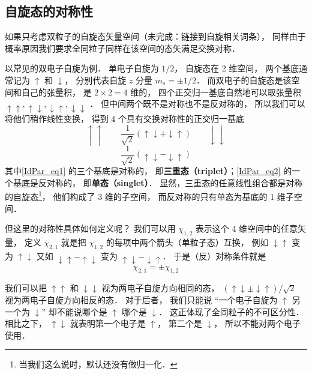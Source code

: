 \subsection{自旋态的对称性}
如果只考虑双粒子的自旋态矢量空间（未完成：链接到自旋相关词条）， 同样由于概率原因我们要求全同粒子同样在该空间的态矢满足交换对称．

\begin{example}{}\label{IdPar_ex1}
以常见的双电子自旋为例． 单电子自旋为 $1/2$， 自旋态在 2 维空间， 两个基底通常记为 $\uparrow$ 和 $\downarrow$， 分别代表自旋 $z$ 分量 $m_s=\pm 1/2$． 而双电子的自旋态是该空间和自己的张量积， 是 $2\times2 = 4$ 维的， 四个正交归一基底自然地可以取张量积 $\uparrow\uparrow, \uparrow\downarrow, \downarrow\uparrow, \downarrow\downarrow$ ． 但中间两个既不是对称也不是反对称的， 所以我们可以将他们稍作线性变换， 得到 4 个具有交换对称性的正交归一基底
\begin{equation}\label{IdPar_eq1}
\uparrow\uparrow \qquad \frac{1}{\sqrt 2}(\uparrow\downarrow + \downarrow\uparrow) \qquad \downarrow\downarrow
\end{equation}
\begin{equation}\label{IdPar_eq2}
\frac{1}{\sqrt 2}(\uparrow\downarrow - \downarrow\uparrow)
\end{equation}
其中\autoref{IdPar_eq1} 的三个基底是对称的， 即\textbf{三重态（triplet）}；\autoref{IdPar_eq2} 的一个基底是反对称的， 即\textbf{单态（singlet）}． %
显然，三重态的任意线性组合都是对称的自旋态\footnote{当我们这么说时，默认还没有做归一化．}， 他们构成了 3 维的子空间， 而反对称的只有单态为基底的 1 维子空间．

但这里的对称性具体如何定义呢？ 我们可以用 $\chi_{1,2}$ 表示这个 4 维空间中的任意矢量， 定义 $\chi_{2,1}$ 就是把 $\chi_{1,2}$ 的每项中两个箭头（单粒子态）互换， 例如 $\downarrow\uparrow$ 变为 $\uparrow\downarrow$ 又如 $\downarrow\uparrow - \uparrow\downarrow$ 变为 $\uparrow\downarrow - \downarrow\uparrow$． 于是（反）对称条件就是
\begin{equation}\label{IdPar_eq3}
\chi_{2,1} = \pm\chi_{1,2}
\end{equation}

我们可以把 $\uparrow\uparrow$ 和 $\downarrow\downarrow$ 视为两电子自旋方向相同的态， $(\uparrow\downarrow \pm \downarrow\uparrow)/\sqrt{2}$ 视为两电子自旋方向相反的态． 对于后者， 我们只能说 “一个电子自旋为 $\uparrow$ 另一个为 $\downarrow$” 却不能说哪个是 $\uparrow$ 哪个是 $\downarrow$． 这正体现了全同粒子的不可区分性． 相比之下， $\uparrow\downarrow$ 就表明第一个电子是 $\uparrow$， 第二个是 $\downarrow$， 所以不能对两个电子使用．
\end{example}

